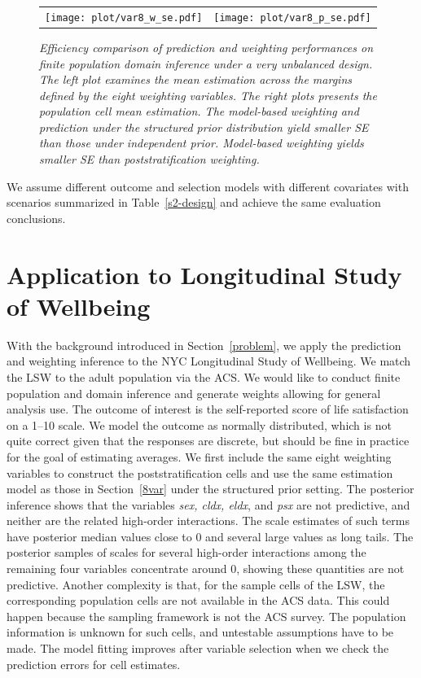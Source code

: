 \documentclass[11pt]{article}
\numberwithin{figure}{section}
\numberwithin{table}{section}
\numberwithin{equation}{section}
\begin{document}
 \begin{figure} \centering \begin{tabular}{cc}
 \texttt{[image: plot/var8\_w\_se.pdf]}&
 \texttt{[image: plot/var8\_p\_se.pdf]}\\ \end{tabular}
 \caption{\em Efficiency comparison of prediction and weighting performances on
 finite population domain inference under a very unbalanced design. The left
 plot examines the mean estimation across the margins defined by the eight
 weighting variables. The right plots presents the population cell mean
 estimation. The model-based weighting and prediction under the structured
 prior distribution yield smaller SE than those under independent prior.
 Model-based weighting yields smaller SE than poststratification weighting.}
 \label{sim2-se} \end{figure} 


We assume different outcome and selection models with different covariates with
scenarios summarized in Table~\ref{s2-design} and achieve the same evaluation
conclusions. 

\section{Application to Longitudinal Study of Wellbeing} \label{application}

With the background introduced in Section~\ref{problem}, we apply the
prediction and weighting inference to the NYC Longitudinal Study of Wellbeing.
We match the LSW to the adult population via the ACS. We would like to conduct
finite population and domain inference and generate weights allowing for
general analysis use. The outcome of interest is the self-reported score of
life satisfaction on a 1--10 scale.  We model the outcome as normally
distributed, which is not quite correct given that the responses are discrete,
but should be fine in practice for the goal of estimating averages. We first
include the same eight weighting variables to construct the poststratification
cells and use the same estimation model as those in Section~\ref{8var} under
the structured prior setting. The posterior inference shows that the variables
{\em sex, cldx, eldx}, and {\em psx} are not predictive, and neither are the
related high-order interactions. The scale estimates of such terms have
posterior median values close to 0 and several large values as long tails. The
posterior samples of scales for several high-order interactions among the
remaining four variables concentrate around 0, showing these quantities are not
predictive. Another complexity is that, for the sample cells of the LSW, the
corresponding population cells are not available in the ACS data. This could
happen because the sampling framework is not the ACS survey. The population
information is unknown for such cells, and untestable assumptions have to be
made. The model fitting improves after variable selection when we check the
prediction errors for cell estimates.
\end{document}
